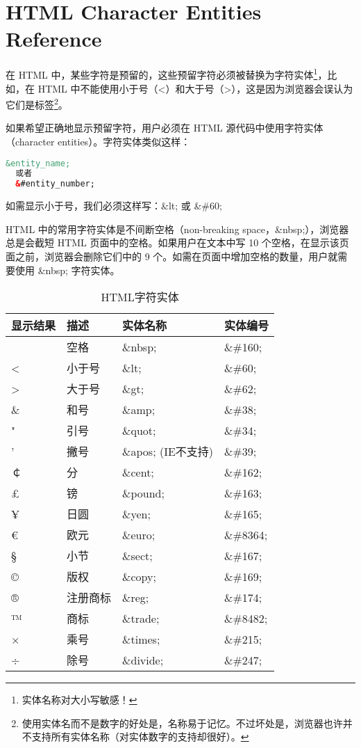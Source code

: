 \chapter{HTML Character Entities Reference}


在 HTML 中，某些字符是预留的，这些预留字符必须被替换为字符实体\footnote{实体名称对大小写敏感！}，比如，在 HTML 中不能使用小于号（<）和大于号（>），这是因为浏览器会误认为它们是标签\footnote{使用实体名而不是数字的好处是，名称易于记忆。不过坏处是，浏览器也许并不支持所有实体名称（对实体数字的支持却很好）。}。

如果希望正确地显示预留字符，用户必须在 HTML 源代码中使用字符实体（character entities）。字符实体类似这样：

\begin{lstlisting}[language=HTML]
  &entity_name;
  或者
  &#entity_number;
\end{lstlisting}

如需显示小于号，我们必须这样写：\&lt; 或 \&\#60;

HTML 中的常用字符实体是不间断空格（non-breaking space，\&nbsp;），浏览器总是会截短 HTML 页面中的空格。如果用户在文本中写 10 个空格，在显示该页面之前，浏览器会删除它们中的 9 个。如需在页面中增加空格的数量，用户就需要使用 \&nbsp; 字符实体。

\begin{table}[!h]
\centering
\caption{HTML字符实体}
\begin{tabular}{|l|l|l|l|}
\hline
显示结果		&描述		&实体名称	&实体编号	\\
\hline
 			&空格		&\&nbsp;		&\&\#160;	\\
\hline
<			&小于号		&\&lt;		&\&\#60;	\\
\hline
>			&大于号		&\&gt;		&\&\#62;	\\
\hline
\&			&和号		&\&amp;		&\&\#38;\\
\hline
"			&引号		&\&quot;		&\&\#34;\\
\hline
'			&撇号 		&\&apos; (IE不支持)&\&\#39;\\
\hline
￠			&分			&\&cent;		&\&\#162;\\
\hline
£			&镑			&\&pound;	&\&\#163;\\
\hline
¥			&日圆		&\&yen;		&\&\#165;\\
\hline
€			&欧元		&\&euro;		&\&\#8364;\\
\hline
§			&小节		&\&sect;		&\&\#167;\\
\hline
©			&版权		&\&copy;		&\&\#169;\\
\hline
®			&注册商标	&\&reg;		&\&\#174;\\
\hline
™			&商标		&\&trade;	&\&\#8482;\\
\hline
×			&乘号		&\&times;	&\&\#215;\\
\hline
÷			&除号		&\&divide;	&\&\#247;\\
\hline
\end{tabular}
\end{table}


